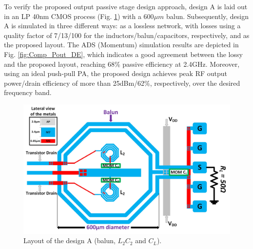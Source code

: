 \documentclass[conference]{IEEEtran}
\begin{document}
To verify the proposed output passive stage design approach,  design A is laid out in an LP 40nm CMOS process (Fig. \ref{fig:ON_X1}) with a 600$\mu m$ balun. Subsequently, design A is simulated in three different ways: as a lossless network, with losses using a quality factor of 7/13/100 for the inductors/balun/capacitors, respectively, and as the proposed layout. The ADS (Momentum) simulation results are depicted in Fig. \ref{fig:Comp_Pout_DE}, which indicates a good agreement between the lossy and the proposed layout, reaching 68\% passive efficiency at 2.4GHz. Moreover, using an ideal push-pull PA, the proposed design achieves peak RF output power/drain efficiency of more than 25dBm/62\%, respectively, over the desired frequency band.

\begin{figure}[!t]
\centering
\captionsetup{font=footnotesize}
\includegraphics[width=1\linewidth]{Images/Output_Network_Comp/Balun_V2.jpg}
\caption{Layout of the design A (balun, $L_2C_2$ and $C_L$).}
\label{fig:ON_X1}
\vspace{-0.2in}
\end{figure}
\end{document}
